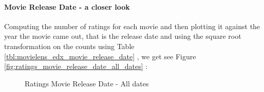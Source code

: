 \documentclass[
]{article}
\begin{document}
\newpage

\hypertarget{movie-release-date---a-closer-look}{%
\paragraph{Movie Release Date - a closer
look}\label{movie-release-date---a-closer-look}}

Computing the number of ratings for each movie and then plotting it
against the year the movie came out, that is the release date and using
the square root transformation on the counts using Table
\ref{tbl:movielens_edx_movie_release_date} , we get see Figure
\ref{fig:ratings_movie_release_date_all_dates} :

\begin{figure}[h!]

{\centering {}\newline{}

}

\caption{Ratings Movie Release Date - All dates\label{fig:ratings_movie_release_date_all_dates}}\label{fig:md_1}
\end{figure}
\end{document}
